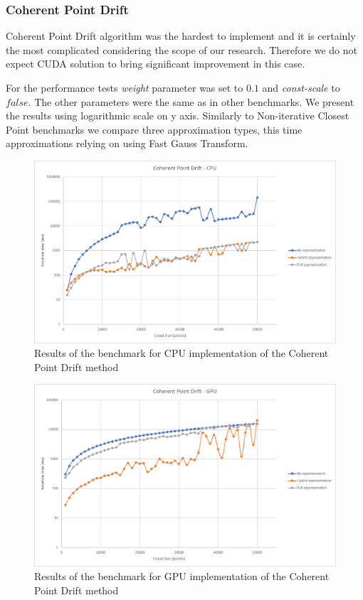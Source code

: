 \documentclass[titlepage]{article}
\begin{document}
\subsubsection{Coherent Point Drift}
Coherent Point Drift algorithm was the hardest to implement and it is certainly the most complicated considering the scope of our research. Therefore we do not expect CUDA solution to bring significant improvement in this case.

For the performance tests \textit{weight} parameter was set to $0.1$ and \textit{const-scale} to $false$. The other parameters were the same as in other benchmarks. We present the results using logarithmic scale on y axis. Similarly to Non-iterative Closest Point benchmarks we compare three approximation types, this time approximations relying on using Fast Gauss Transform.

\begin{figure}[H]
\includegraphics[width=\textwidth]{ms-cpd-1.png}
\caption{Results of the benchmark for CPU implementation of the Coherent Point Drift method}
\end{figure}

\begin{figure}[H]
\includegraphics[width=\textwidth]{ms-cpd-2.png}
\caption{Results of the benchmark for GPU implementation of the Coherent Point Drift method}
\end{figure}
\end{document}
